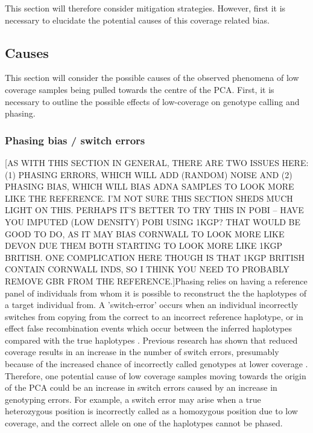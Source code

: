 This section will therefore consider mitigation strategies. However, first it is necessary to elucidate the potential causes of this coverage related bias. 

\subsection{Causes}

This section will consider the possible causes of the observed phenomena of low coverage samples being pulled towards the centre of the PCA. First, it is necessary to outline the possible effects of low-coverage on genotype calling and phasing. 

\subsubsection{Phasing bias / switch errors}

{\color{red}[AS WITH THIS SECTION IN GENERAL, THERE ARE TWO ISSUES HERE: (1) PHASING ERRORS, WHICH WILL ADD (RANDOM) NOISE AND (2) PHASING BIAS, WHICH WILL BIAS ADNA SAMPLES TO LOOK MORE LIKE THE REFERENCE. I'M NOT SURE THIS SECTION SHEDS MUCH LIGHT ON THIS. PERHAPS IT'S BETTER TO TRY THIS IN POBI -- HAVE YOU IMPUTED (LOW DENSITY) POBI USING 1KGP? THAT WOULD BE GOOD TO DO, AS IT MAY BIAS CORNWALL TO LOOK MORE LIKE DEVON DUE THEM BOTH STARTING TO LOOK MORE LIKE 1KGP BRITISH. ONE COMPLICATION HERE THOUGH IS THAT 1KGP BRITISH CONTAIN CORNWALL INDS, SO I THINK YOU NEED TO PROBABLY REMOVE GBR FROM THE REFERENCE.]}Phasing relies on having a reference panel of individuals from whom it is possible to reconstruct the the haplotypes of a target individual from. A 'switch-error' occurs when an individual incorrectly switches from copying from the correct to an incorrect reference haplotype, or in effect false recombination events which occur between the inferred haplotypes compared with the true haplotypes \cite{choi2018comparison}. Previous research has shown that reduced coverage results in an increase in the number of switch errors, presumably because of the increased chance of incorrectly called genotypes at lower coverage \cite{rubinacci2021efficient}. Therefore, one potential cause of low coverage samples moving towards the origin of the PCA could be an increase in switch errors caused by an increase in genotyping errors. For example, a switch error may arise when a true heterozygous position is incorrectly called as a homozygous position due to low coverage, and the correct allele on one of the haplotypes cannot be phased. 

